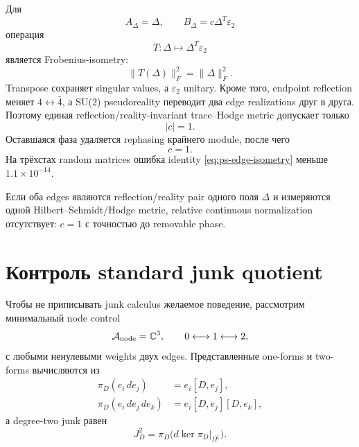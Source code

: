Для
\begin{equation}
 A_\Delta=\Delta,
 \qquad
 B_\Delta=c\Delta^T\varepsilon_2
\end{equation}
операция
\begin{equation}
 T:\Delta\longmapsto\Delta^T\varepsilon_2
\end{equation}
является Frobenius-isometry:
\begin{equation}
 \|T(\Delta)\|_F^2=\|\Delta\|_F^2.
 \label{eq:ps-edge-isometry}
\end{equation}
Transpose сохраняет singular values, а \(\varepsilon_2\) unitary. Кроме
того, endpoint reflection меняет \(4\leftrightarrow\bar4\), а SU(2)
pseudoreality переводит два edge realizations друг в друга. Поэтому единая
reflection/reality-invariant trace--Hodge metric допускает только
\begin{equation}
 |c|=1.
\end{equation}
Оставшаяся фаза удаляется rephasing крайнего module, после чего
\begin{equation}
 \boxed{c=1.}
 \label{eq:ps-canonical-edge-normalization}
\end{equation}
На трёхстах random matrices ошибка identity
\eqref{eq:ps-edge-isometry} меньше \(1.1\times10^{-14}\).

\begin{proposition}
Если оба edges являются reflection/reality pair одного поля \(\Delta\) и
измеряются одной Hilbert--Schmidt/Hodge metric, relative continuous
normalization отсутствует: \(c=1\) с точностью до removable phase.
\end{proposition}

\section{Контроль standard junk quotient}

Чтобы не приписывать junk calculus желаемое поведение, рассмотрим минимальный
node control
\begin{equation}
 \mathcal A_{\rm node}=\mathbb C^3,
 \qquad
 0\longleftrightarrow1\longleftrightarrow2,
\end{equation}
с любыми ненулевыми weights двух edges. Представленные one-forms и two-forms
вычисляются из
\begin{align}
 \pi_D(e_i\,de_j)&=e_i[D,e_j],\\
 \pi_D(e_i\,de_j\,de_k)&=e_i[D,e_j][D,e_k],
\end{align}
а degree-two junk равен
\begin{equation}
 J_D^2=\pi_D\bigl(d\ker\pi_D|_{\Omega^1}\bigr).
\end{equation}


